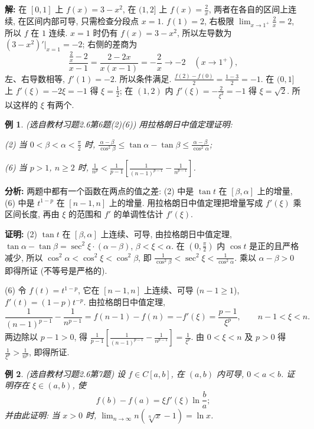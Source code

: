 \documentclass[UTF8,openany]{ctexbook}
\theoremstyle{chinesetextbook}
\newtheorem{example}{例}[section]
\newenvironment{cnproof}{\par\indent\textbf{证明:} \ignorespaces}{\par}
\newenvironment{cnsolution}{\par\indent\textbf{解:} \ignorespaces}{\par}
\begin{document}
\begin{cnsolution}
在 $[0,1]$ 上 $f(x)=3-x^2$, 在 $(1,2]$ 上 $\displaystyle f(x)=\frac2x$, 两者在各自的区间上连续, 在区间内部可导, 只需检查分段点 $x=1$. $f(1)=2$, 右极限 $\displaystyle\lim_{x\to1^+}\frac2x=2$, 所以 $f$ 在 $1$ 连续. $x=1$ 时仍有 $f(x)=3-x^2$, 所以左导数为 $(3-x^2)'\big|_{x=1}=-2$; 右侧的差商为
\[
\frac{\frac2x-2}{x-1}=\frac{2-2x}{x(x-1)}=-\frac2x\to-2\quad(x\to1^+),
\]
左、右导数相等, $f'(1)=-2$. 所以条件满足. $\displaystyle\frac{f(2)-f(0)}2=\frac{1-3}2=-1$. 在 $(0,1]$ 上 $f'(\xi)=-2\xi=-1$ 得 $\displaystyle\xi=\frac12$; 在 $(1,2)$ 内 $\displaystyle f'(\xi)=-\frac2{\xi^2}=-1$ 得 $\xi=\sqrt2$. 所以这样的 $\xi$ 有两个.
\end{cnsolution}
\begin{example}\label{ex:c2-h6-6}
\textnormal{(选自教材习题2.6第6题(2)(6))} 用拉格朗日中值定理证明:

(2) 当 $\displaystyle0<\beta<\alpha<\frac\pi2$ 时, $\displaystyle\frac{\alpha-\beta}{\cos^2\beta}\le\tan\alpha-\tan\beta\le\frac{\alpha-\beta}{\cos^2\alpha}$;

(6) 当 $p>1$, $n\ge2$ 时, $\displaystyle\frac1{n^p}<\frac1{p-1}\left[\frac1{(n-1)^{p-1}}-\frac1{n^{p-1}}\right]$.
\end{example}
\par\indent\textbf{分析:} 两题中都有一个函数在两点的值之差: (2) 中是 $\tan t$ 在 $[\beta,\alpha]$ 上的增量, (6) 中是 $t^{1-p}$ 在 $[n-1,n]$ 上的增量. 用拉格朗日中值定理把增量写成 $f'(\xi)$ 乘区间长度, 再由 $\xi$ 的范围和 $f'$ 的单调性估计 $f'(\xi)$.
\begin{cnproof}
(2) $\tan t$ 在 $[\beta,\alpha]$ 上连续、可导, 由拉格朗日中值定理, $\tan\alpha-\tan\beta=\sec^2\xi\cdot(\alpha-\beta)$, $\beta<\xi<\alpha$. 在 $\displaystyle\left(0,\frac\pi2\right)$ 内 $\cos t$ 是正的且严格减少, 所以 $\cos^2\alpha<\cos^2\xi<\cos^2\beta$, 即 $\displaystyle\frac1{\cos^2\beta}<\sec^2\xi<\frac1{\cos^2\alpha}$. 乘以 $\alpha-\beta>0$ 即得所证 (不等号是严格的).

(6) 令 $f(t)=t^{1-p}$, 它在 $[n-1,n]$ 上连续、可导 ($n-1\ge1$), $f'(t)=(1-p)t^{-p}$. 由拉格朗日中值定理,
\[
\frac1{(n-1)^{p-1}}-\frac1{n^{p-1}}=f(n-1)-f(n)=-f'(\xi)=\frac{p-1}{\xi^p},\qquad n-1<\xi<n.
\]
两边除以 $p-1>0$, 得 $\displaystyle\frac1{p-1}\left[\frac1{(n-1)^{p-1}}-\frac1{n^{p-1}}\right]=\frac1{\xi^p}$. 由 $0<\xi<n$ 及 $p>0$ 得 $\displaystyle\frac1{\xi^p}>\frac1{n^p}$, 即得所证.
\end{cnproof}
\begin{example}\label{ex:c2-h6-7}
\textnormal{(选自教材习题2.6第7题)} 设 $f\in C[a,b]$, 在 $(a,b)$ 内可导, $0<a<b$. 证明存在 $\xi\in(a,b)$, 使
\[
f(b)-f(a)=\xi f'(\xi)\ln\frac ba;
\]
并由此证明: 当 $x>0$ 时, $\displaystyle\lim_{n\to\infty}n\left(\sqrt[n]x-1\right)=\ln x$.
\end{example}
\end{document}
